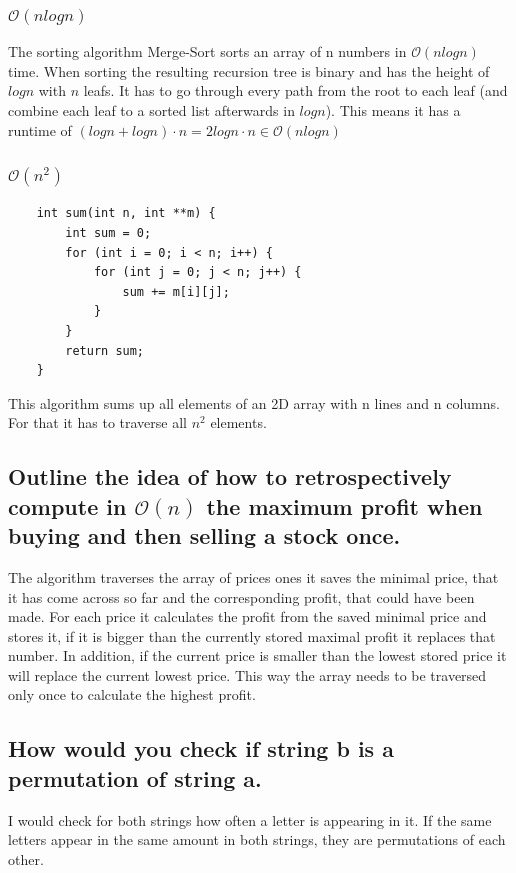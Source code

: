 \documentclass[runningheads]{llncs}
\begin{document}
\subsubsection*{$\mathcal{O}(n log n)$}
The sorting algorithm Merge-Sort sorts an array of n numbers in $\mathcal{O}(n log n)$ time. When sorting the resulting
recursion tree is binary and has the height of $log n$ with $n$ leafs. It has to go through every path from the root
to each leaf (and combine each leaf to a sorted list afterwards in $log n$). This means it has a runtime of
$(log n + log n) \cdot n = 2 log n \cdot n \in \mathcal{O}(n log n)$

\subsubsection*{$\mathcal{O}(n^2)$}
\begin{verbatim}
    int sum(int n, int **m) {
        int sum = 0;
        for (int i = 0; i < n; i++) {
            for (int j = 0; j < n; j++) {
                sum += m[i][j];
            }
        }
        return sum;
    }
\end{verbatim}
This algorithm sums up all elements of an 2D array with n lines and n columns. For that it has to traverse all $n^2$
elements.

\subsection*{Outline the idea of how to retrospectively compute in $\mathcal{O}(n)$ the maximum profit when buying and then selling
    a stock once.}

The algorithm traverses the array of prices ones it saves the minimal price, that it has come across so far and the
corresponding profit, that could have been made. For each price it calculates the profit from the saved minimal price
and stores it, if it is bigger than the currently stored maximal profit it replaces that number. In addition, if the
current price is smaller than the lowest stored price it will replace the current lowest price. This way the array
needs to be traversed only once to calculate the highest profit.

\subsection*{How would you check if string b is a permutation of string a.}

I would check for both strings how often a letter is appearing in it. If the same letters appear in the same amount
in both strings, they are permutations of each other.
\end{document}
